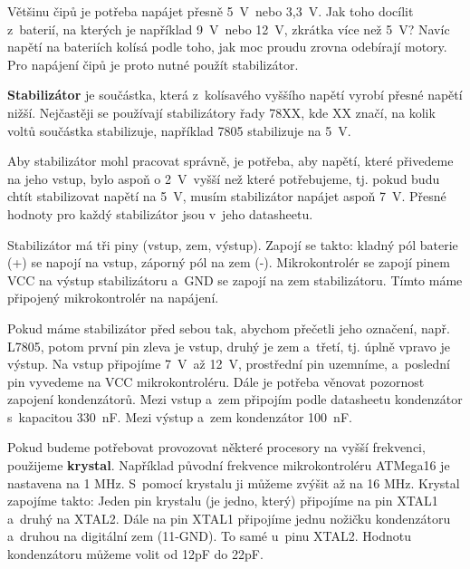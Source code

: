 
Většinu čipů je potřeba napájet přesně 5~V~nebo 3,3~V. Jak toho docílit z~baterií, na kterých je například 9~V~nebo 12~V, zkrátka více než 5~V? Navíc napětí na bateriích kolísá podle toho, jak moc proudu zrovna odebírají motory. 
Pro napájení čipů je proto nutné použít stabilizátor. 

{\bf Stabilizátor}  je součástka, která z~kolísavého vyššího napětí vyrobí přesné napětí nižší. %
Nejčastěji se používají stabilizátory řady 78XX, kde XX značí, na kolik voltů součástka stabilizuje, například 7805 stabilizuje na 5~V. 

Aby stabilizátor mohl pracovat správně, je potřeba, aby napětí, které přivedeme na jeho vstup, bylo aspoň o 2~V~vyšší než které potřebujeme, tj. pokud budu chtít stabilizovat napětí na 5~V, musím stabilizátor napájet aspoň 7~V. Přesné hodnoty pro každý stabilizátor jsou v~jeho datasheetu. 

Stabilizátor má tři piny (vstup, zem, výstup). Zapojí se takto: kladný pól baterie (+) se napojí na vstup, záporný pól na zem (-). Mikrokontrolér se zapojí pinem VCC na výstup stabilizátoru a~GND  se zapojí na zem stabilizátoru. Tímto máme připojený mikrokontrolér na napájení.


Pokud máme stabilizátor před sebou tak, abychom přečetli jeho označení, např. L7805, potom první pin zleva je vstup, druhý je zem a~třetí, tj. úplně vpravo je výstup. Na vstup připojíme 7~V~až 12~V, prostřední pin uzemníme, a~poslední pin vyvedeme na VCC mikrokontroléru. Dále je potřeba věnovat pozornost zapojení kondenzátorů. Mezi vstup a~zem připojím podle datasheetu kondenzátor s~kapacitou 330~nF. Mezi výstup a~zem kondenzátor 100~nF. 



Pokud budeme potřebovat provozovat některé procesory na vyšší frekvenci, použijeme  {\bf krystal}. Například původní frekvence mikrokontroléru ATMega16 je nastavena na 1 MHz. S~pomocí krystalu ji můžeme zvýšit až na 16 MHz. 
Krystal zapojíme takto: Jeden pin krystalu (je jedno, který) připojíme na pin XTAL1 a~druhý na XTAL2. Dále na pin XTAL1 připojíme jednu nožičku kondenzátoru a~druhou na digitální zem (11-GND). To samé u~pinu XTAL2. Hodnotu kondenzátoru můžeme volit od 12pF do 22pF.

